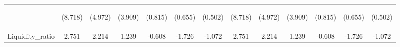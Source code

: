 \documentclass[]{article}
\begin{document}
\begin{center}
\begin{tabular}{lcccccccccccc}
\vspace{4pt} & \begin{footnotesize}(8.718)\end{footnotesize} & \begin{footnotesize}(4.972)\end{footnotesize} & \begin{footnotesize}(3.909)\end{footnotesize} & \begin{footnotesize}(0.815)\end{footnotesize} & \begin{footnotesize}(0.655)\end{footnotesize} & \begin{footnotesize}(0.502)\end{footnotesize} & \begin{footnotesize}(8.718)\end{footnotesize} & \begin{footnotesize}(4.972)\end{footnotesize} & \begin{footnotesize}(3.909)\end{footnotesize} & \begin{footnotesize}(0.815)\end{footnotesize} & \begin{footnotesize}(0.655)\end{footnotesize} & \begin{footnotesize}(0.502)\end{footnotesize} \\
Liquidity\_ratio & 2.751 & 2.214 & 1.239 & -0.608 & -1.726 & -1.072 & 2.751 & 2.214 & 1.239 & -0.608 & -1.726 & -1.072 \\

\end{tabular}
\end{center}
\end{document}
